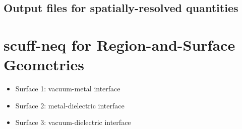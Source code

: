 \documentclass[letterpaper]{article}
\begin{document}

\subsection{Output files for spatially-resolved quantities}

\newpage
\section{{\sc scuff-neq} for Region-and-Surface Geometries}

\begin{itemize}
 \item Surface 1: vacuum-metal interface
 \item Surface 2: metal-dielectric interface
 \item Surface 3: vacuum-dielectric interface
\end{itemize}
\end{document}
